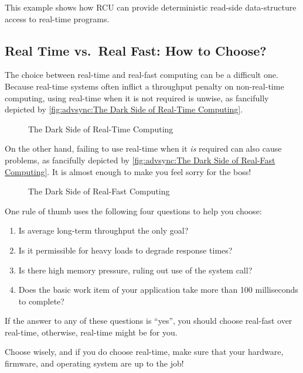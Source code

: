 This example shows how RCU can provide deterministic read-side
data-structure access to real-time programs.

\subsection{Real Time vs.~Real Fast: How to Choose?}
\label{sec:advsync:Real Time vs. Real Fast: How to Choose?}

The choice between real-time and real-fast computing can be a difficult one.
Because real-time systems often inflict a throughput penalty on
non-real-time computing, using real-time when it is not required is
unwise, as fancifully depicted by
\cref{fig:advsync:The Dark Side of Real-Time Computing}.

\begin{figure}
\centering
{}
\caption{The Dark Side of Real-Time Computing}
\end{figure}

On the other hand, failing to use real-time when it \emph{is} required
can also cause problems, as fancifully depicted by
\cref{fig:advsync:The Dark Side of Real-Fast Computing}.
It is almost enough to make you feel sorry for the boss!

\begin{figure}
\centering
{}
\caption{The Dark Side of Real-Fast Computing}
\end{figure}

One rule of thumb uses the following four questions to help you choose:

\begin{enumerate}
\item	Is average long-term throughput the only goal?
\item	Is it permissible for heavy loads to degrade response times?
\item	Is there high memory pressure, ruling out use of
	the  system call?
\item	Does the basic work item of your application take more than
	100 milliseconds to complete?
\end{enumerate}

If the answer to any of these questions is ``yes'', you should choose
real-fast over real-time, otherwise, real-time might be for you.

Choose wisely, and if you do choose real-time, make sure that your
hardware, firmware, and operating system are up to the job!
